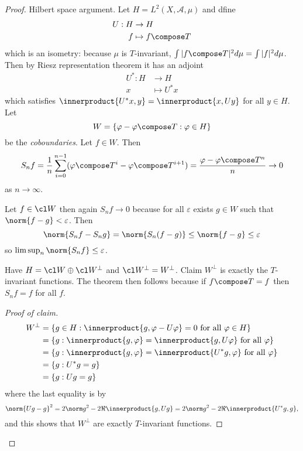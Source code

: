 \documentclass[a4paper]{article}
\newcommand*{\ip}{\innerproduct} %
\begin{document}
\begin{proof}
  Hilbert space argument. Let \(H = L^2(X, \mathcal A, \mu)\) and dfine
  \begin{align*}
    U: H &\to H \\
    f &\mapsto f \compose T
  \end{align*}
  which is an isometry: because \(\mu\) is \(T\)-invariant, \(\int |f \compose T|^2 d\mu = \int |f|^2 d\mu\). Then by Riesz representation theorem it has an adjoint
  \begin{align*}
    U^*: H &\to H \\
    x &\mapsto U^* x
  \end{align*}
  which satisfies \(\ip{U^*x, y} = \ip{x, Uy}\) for all \(y \in H\). Let
  \[
    W = \{\varphi- \varphi \compose T: \varphi \in H\}
  \]
  be the \emph{coboundaries}. Let \(f \in W\). Then
  \[
    S_nf = \frac{1}{n} \sum_{i = 0}^{n - 1} (\varphi \compose T^i - \varphi \compose T^{i + 1}) = \frac{\varphi - \varphi \compose T^n}{n} \to 0
  \]
  as \(n \to \infty\).

  Let \(f \in \cl W\) then again \(S_nf \to 0\) because for all \(\varepsilon\) exists \(g \in W\) such that \(\norm{f - g} < \varepsilon\). Then
  \[
    \norm{S_nf - S_ng}
    = \norm{S_n(f - g)}
    \leq \norm{f - g}
    \leq \varepsilon
  \]
  so \(\limsup_n \norm{S_nf} \leq \varepsilon\).

  Have \(H = \cl W \oplus \cl W^\perp\) and \(\cl W^\perp = W^\perp\). Claim \(W^\perp\) is exactly the \(T\)-invariant functions. The theorem then follows because if \(f \compose T = f\) then \(S_nf = f\) for all \(f\).

  \begin{proof}[Proof of claim]
    \begin{align*}
      W^\perp
      &= \{g \in H: \ip{g, \varphi - U\varphi} = 0 \text{ for all } \varphi \in H\} \\
      &= \{g: \ip{g, \varphi} = \ip{g, U\varphi} \text{ for all } \varphi\} \\
      &= \{g: \ip{g, \varphi} = \ip{U^*g, \varphi} \text{ for all } \varphi\} \\
      &= \{g: U^*g = g\} \\
      &= \{g: Ug = g\}
    \end{align*}
    where the last equality is by
    \[
      \norm{Ug - g}^2 = 2\norm g^2 - 2\Re \ip{g, Ug} = 2 \norm g^2 - 2 \Re \ip{U^*g, g},
    \]
    and this shows that \(W^\perp\) are exactly \(T\)-invariant functions.
  \end{proof}
\end{proof}
\end{document}
